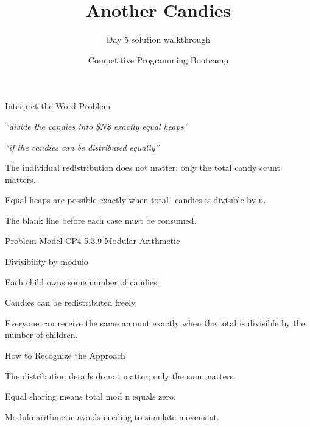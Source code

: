 \documentclass[aspectratio=169,11pt]{beamer}
\title[anothercandies]{Another Candies}
\subtitle{Day 5 solution walkthrough}
\author[Solution Deck]{Competitive Programming Bootcamp}
\date{}
\begin{document}
\begin{frame}[plain]
  \titlepage
\end{frame}

\begin{frame}{Interpret the Word Problem}
\small
{}
\begin{tightitemize}
  \item \textit{``divide the candies into \$N\$ exactly equal heaps''}
  \item \textit{``if the candies can be distributed equally''}
\end{tightitemize}

\vspace{0.18cm}
\begin{tightitemize}
  \item The individual redistribution does not matter; only the total candy count matters.
  \item Equal heaps are possible exactly when total\_candies is divisible by n.
  \item The blank line before each case must be consumed.
\end{tightitemize}
\end{frame}







\begin{frame}{Problem Model}
\small
{} CP4 5.3.9 Modular Arithmetic

\vspace{0.25cm}
 Divisibility by modulo

\vspace{0.25cm}
\begin{tightitemize}
  \item Each child owns some number of candies.
  \item Candies can be redistributed freely.
  \item Everyone can receive the same amount exactly when the total is divisible by the number of children.
\end{tightitemize}
\end{frame}

\begin{frame}{How to Recognize the Approach}
\begin{tightitemize}
  \item The distribution details do not matter; only the sum matters.
  \item Equal sharing means total mod n equals zero.
  \item Modulo arithmetic avoids needing to simulate movement.
\end{tightitemize}
\end{frame}
\end{document}
